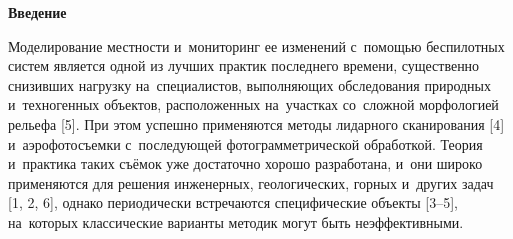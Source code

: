 
 



\makeProcTitleRazdel


\textbf{Введение}

Моделирование местности и~мониторинг ее изменений с~помощью беспилотных систем является одной из лучших практик последнего времени, существенно снизивших нагрузку на~специалистов, выполняющих обследования природных и~техногенных объектов, расположенных на~участках со~сложной морфологией рельефа [5]. При этом успешно применяются методы лидарного сканирования [4] и~аэрофотосъемки с~последующей фотограмметрической обработкой. Теория и~практика таких съёмок уже достаточно хорошо разработана, и~они широко применяются для решения инженерных, геологических, горных и~других задач [1, 2, 6], однако периодически встречаются специфические объекты [3--5], на~которых классические варианты методик могут быть неэффективными.

